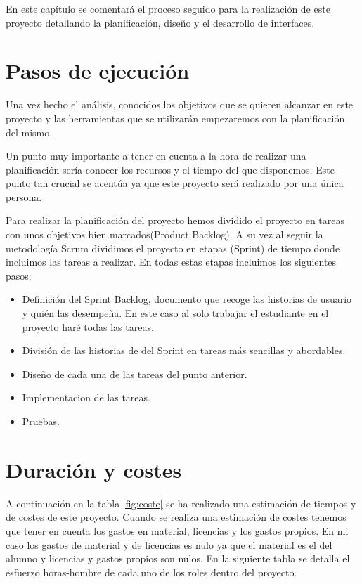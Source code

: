 

 En este capítulo se comentará el proceso seguido para la realización de este proyecto detallando la planificación, diseño y el desarrollo de interfaces.
 
\section{Pasos de ejecución}

Una vez hecho el análisis, conocidos los objetivos que se quieren alcanzar en este proyecto y las herramientas que se utilizarán  empezaremos con la planificación del mismo.

Un punto muy  importante a tener en cuenta a la hora de realizar una planificación sería conocer los recursos y el tiempo del que disponemos.
Este punto tan crucial se acentúa ya que este proyecto será realizado por una única persona.

Para realizar la planificación del proyecto hemos dividido el proyecto en tareas con unos objetivos bien marcados(Product Backlog). A su vez al seguir la metodología Scrum dividimos el proyecto en etapas (Sprint) de tiempo donde incluimos las tareas a realizar.
 En todas estas etapas incluimos los siguientes pasos:
 
 


\begin{itemize}
\item Definición del Sprint Backlog,  documento que recoge las historias de usuario y quién las desempeña. En este caso al solo trabajar el estudiante en el proyecto haré todas las tareas.


\item División de las historias de del Sprint en tareas más sencillas y abordables. 



\item Diseño de cada una de las tareas del punto anterior.
\item  Implementacion de las tareas.
\item Pruebas.
\end{itemize}



\section{Duración  y costes}
 A continuación en la tabla \ref{fig:coste} se ha realizado una estimación de tiempos y de costes de este proyecto.
 Cuando se realiza una estimación de costes tenemos que tener en cuenta los gastos en material, licencias y los gastos propios. En mi caso los gastos de material y de licencias es nulo ya que el material es el del alumno y licencias y gastos propios son nulos.
 En la siguiente tabla se detalla el esfuerzo horas-hombre de cada uno de los roles dentro del proyecto. 
 
